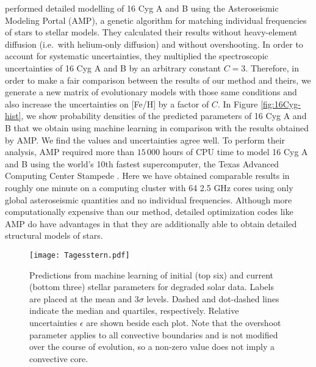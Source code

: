 \documentclass[manuscript,linenumbers]{aastex6}
\newif\ifref
\newcommand{\mb}[1]{\ifref\boldmath\textbf{#1}\unboldmath\else #1\fi}
\begin{document}
\citet{2015ApJ...811L..37M} performed detailed modelling of 16 Cyg A and B using the Asteroseismic Modeling Portal (AMP), a genetic algorithm for matching individual frequencies of stars to stellar models. They calculated their results without heavy-element diffusion (i.e.\ with helium-only diffusion) and without overshooting. In order to account for systematic uncertainties, they multiplied the spectroscopic uncertainties of 16 Cyg A and B by an arbitrary constant $C=3$. Therefore, in order to make a fair comparison between the results of our method and theirs, we generate a new matrix of evolutionary models with those same conditions and also increase the uncertainties on [Fe/H] by a factor of $C$. In Figure \ref{fig:16Cyg-hist}, we show probability densities of the predicted parameters of 16 Cyg A and B that we obtain using machine learning in comparison with the results obtained by AMP. We find the values and uncertainties agree well. To perform their analysis, AMP required more than $15\,000$ hours of CPU time to model 16 Cyg A and B using the world's 10th fastest supercomputer, the Texas Advanced Computing Center Stampede \citep{TOP500}. Here we have obtained comparable results in roughly one minute \mb{on a computing cluster with 64 2.5 GHz cores} using only global asteroseismic \mb{quantities} and no individual frequencies. Although more computationally expensive than our method, detailed optimization codes like AMP do have advantages in that they are additionally able to obtain detailed structural models of stars. %

\begin{figure*}
    \centering
    \texttt{[image: Tagesstern.pdf]}
    \caption{Predictions from machine learning of initial (top six) and current (bottom three) stellar parameters for degraded solar data. Labels are placed at the mean and 3$\sigma$ levels. \mb{Dashed and dot-dashed} lines indicate the median and quartiles\mb{, respectively}. Relative uncertainties $\epsilon$ are shown beside each plot. Note that the overshoot parameter applies to all convective boundaries and is not modified over the course of evolution, so a non-zero value does not imply a convective core. %
    \label{fig:corner} } 
\end{figure*}
\end{document}
